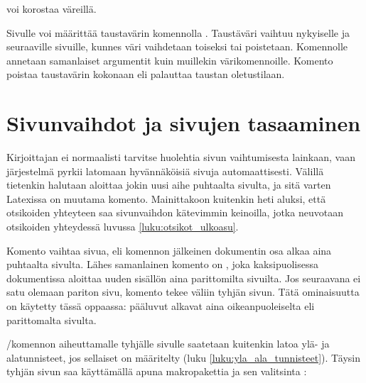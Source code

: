 \begin{tulossis}
   \setlength{\fboxrule}{2bp}
  \textcolor{pun}{voi korostaa} \colorbox{pun}{väreillä}.
\end{tulossis}

Sivulle voi määrittää taustavärin komennolla .
Taustäväri vaihtuu nykyiselle ja seuraaville sivuille, kunnes väri
vaihdetaan toiseksi tai poistetaan. Komennolle annetaan samanlaiset
argumentit kuin muillekin värikomennoille. Komento
 poistaa taustavärin kokonaan eli palauttaa
taustan oletustilaan.

\begin{koodilohkosis}
\pagecolor{nimi} %
\pagecolor[värimalli]{parametrit}
\nopagecolor
\end{koodilohkosis}

\section{Sivunvaihdot ja sivujen tasaaminen}
\label{luku:sivunvaihdot}

Kirjoittajan ei normaalisti tarvitse huolehtia sivun vaihtumisesta
lainkaan, vaan järjestelmä pyrkii latomaan hyvännäköisiä sivuja
automaattisesti. Välillä tietenkin halutaan aloittaa jokin uusi aihe
puhtaalta sivulta, ja sitä varten Latexissa on muutama komento.
Mainittakoon kuitenkin heti aluksi, että otsikoiden yhteyteen saa
sivunvaihdon kätevimmin keinoilla, jotka neuvotaan otsikoiden yhteydessä
luvussa \ref{luku:otsikot_ulkoasu}.

Komento  vaihtaa sivua, eli komennon jälkeinen
dokumentin osa alkaa aina puhtaalta sivulta. Lähes samanlainen komento
on , joka kaksipuolisessa dokumentissa
aloittaa uuden sisällön aina parittomilta sivuilta. Jos seuraavana ei
satu olemaan pariton sivu, komento tekee väliin tyhjän sivun. Tätä
ominaisuutta on käytetty tässä oppaassa: pääluvut alkavat aina
oikeanpuoleiselta eli parittomalta sivulta.

\-/komennon aiheuttamalle tyhjälle sivulle
saatetaan kuitenkin latoa ylä- ja alatunnisteet, jos sellaiset on
määritelty (luku \ref{luku:yla_ala_tunnisteet}). Täysin tyhjän sivun saa
käyttämällä apuna makropakettia  ja
sen valitsinta :

\begin{koodilohkosis}
\usepackage[clearempty]{titlesec}
\end{koodilohkosis}

